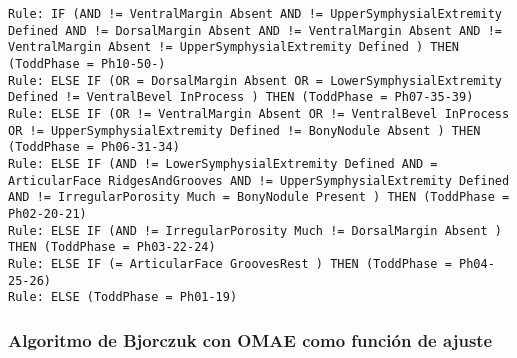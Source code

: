 \begin{lstlisting}
Rule: IF (AND != VentralMargin Absent AND != UpperSymphysialExtremity Defined AND != DorsalMargin Absent AND != VentralMargin Absent AND != VentralMargin Absent != UpperSymphysialExtremity Defined ) THEN (ToddPhase = Ph10-50-)
Rule: ELSE IF (OR = DorsalMargin Absent OR = LowerSymphysialExtremity Defined != VentralBevel InProcess ) THEN (ToddPhase = Ph07-35-39)
Rule: ELSE IF (OR != VentralMargin Absent OR != VentralBevel InProcess OR != UpperSymphysialExtremity Defined != BonyNodule Absent ) THEN (ToddPhase = Ph06-31-34)
Rule: ELSE IF (AND != LowerSymphysialExtremity Defined AND = ArticularFace RidgesAndGrooves AND != UpperSymphysialExtremity Defined AND != IrregularPorosity Much = BonyNodule Present ) THEN (ToddPhase = Ph02-20-21)
Rule: ELSE IF (AND != IrregularPorosity Much != DorsalMargin Absent ) THEN (ToddPhase = Ph03-22-24)
Rule: ELSE IF (= ArticularFace GroovesRest ) THEN (ToddPhase = Ph04-25-26)
Rule: ELSE (ToddPhase = Ph01-19)
\end{lstlisting}

\subsubsection{Algoritmo de Bjorczuk con OMAE como función de ajuste}

